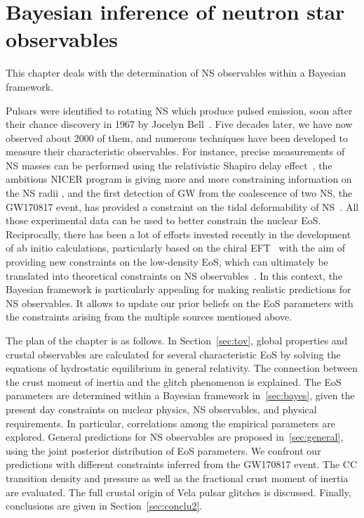 %

\chapter{Bayesian inference of neutron star observables}

This chapter deals with the determination of NS observables within a Bayesian 
framework.

Pulsars were identified to rotating NS which produce pulsed emission, soon 
after their chance discovery in 1967 by Jocelyn Bell~\cite{Hewish1968}. Five
decades later, we have now observed about 2000 of them, and numerous techniques
have been developed to measure their characteristic observables. For instance, 
precise measurements of NS masses can be performed using the relativistic 
Shapiro delay effect~\cite{Demorest2010,Antoniadis2013,Cromartie2020}, the
ambitious NICER program {is giving more and more constraining information 
  on the NS radii
\cite{Bogdanov2019a,Bogdanov2019b,Miller2019,Raaijmakers2019,Riley2019}}, and 
the first detection of GW from the coalescence of two NS, the GW170817 event, 
has provided a
constraint on the tidal deformability of NS~\cite{GWtidal,GW1,GW2}. All those
experimental data can be used to better constrain the nuclear EoS. 
Reciprocally, there has been a lot of efforts invested recently in the 
development of ab initio calculations, particularly based on the chiral 
EFT~\cite{Drischler2016} with the aim of providing new 
constraints on the low-density EoS, which can
ultimately be translated into theoretical constraints on NS
observables~\cite{Carreau2019cc,Carreau2019moi}.
In this context, the Bayesian framework is particularly appealing for making 
realistic predictions for NS observables. It allows to update our prior beliefs 
on the EoS parameters with the constraints arising from the multiple sources 
mentioned above.

The plan of the chapter is as follows. In Section~\ref{sec:tov}, global
properties and crustal observables are calculated for several characteristic 
EoS by solving the equations of hydrostatic equilibrium in general relativity.
The connection between the crust moment of inertia and the glitch phenomenon is
explained. The EoS parameters are determined within a 
Bayesian framework in~\ref{sec:bayes}, given the present day constraints on
nuclear physics, NS observables, and physical requirements. In particular,
correlations among the empirical parameters are explored. General predictions
for NS observables are proposed in~\ref{sec:general}, using the joint posterior
distribution of EoS parameters. We confront our predictions with different 
constraints inferred from the GW170817 event. The CC transition density and
pressure as well as the fractional crust moment of inertia are evaluated. The
full crustal origin of Vela pulsar glitches is discussed. Finally, conclusions 
are given in Section~\ref{sec:conclu2}.


